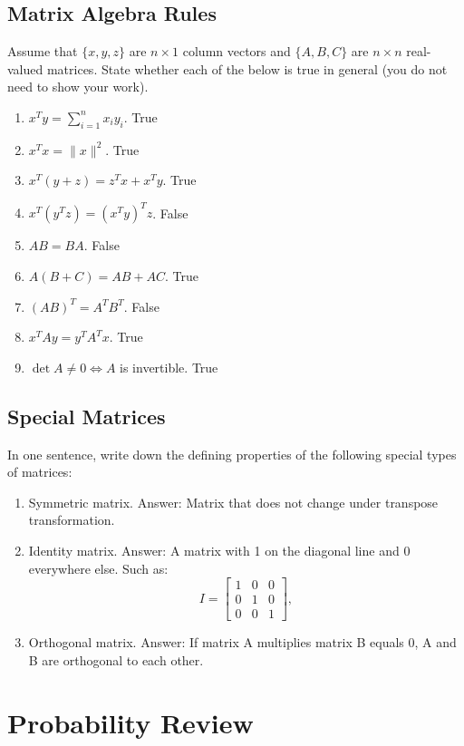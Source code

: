\documentclass{article}
\def\blu#1{{\color{blu}#1}}
\def\norm#1{\|#1\|}
\def\enum#1{\begin{enumerate}#1\end{enumerate}}
\begin{document}
\subsection{Matrix Algebra Rules}

Assume that $\{x,y,z\}$ are $n \times 1$ column vectors and $\{A,B,C\}$ are $n \times n$ real-valued matrices. \blu{State whether each of the below is true in general} (you do not need to show your work).

\begin{enumerate}
\item $x^Ty = \sum_{i=1}^n x_iy_i$. True
\item $x^Tx = \norm{x}^2$. True
\item $x^T(y+z) = z^Tx + x^Ty$. True
\item $x^T(y^Tz) = (x^Ty)^Tz$. False
\item $AB=BA$. False
\item $A(B + C) = AB + AC$. True
\item $(AB)^T = A^TB^T$. False
\item $x^TAy = y^TA^Tx$. True
\item $\det A \neq 0 \iff A$ is invertible. True
\end{enumerate}

\subsection{Special Matrices}

\blu{In one sentence, write down the defining properties of the following special types of matrices}:
\enum{
\item Symmetric matrix. Answer: Matrix that does not change under transpose transformation.
\item Identity matrix.
Answer: A matrix with 1 on the diagonal line and 0 everywhere else. Such as:
\[
I = \left[\begin{array}{ccc}
1 & 0 & 0\\
0 & 1 & 0\\
0 & 0 & 1
\end{array}\right],
\]
\item Orthogonal matrix.
Answer: If matrix A multiplies matrix B equals 0, A and B are orthogonal to each other.
}

\section{Probability Review}
\end{document}
